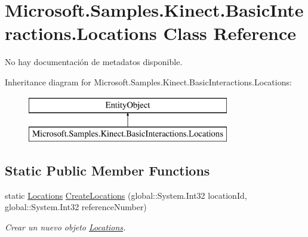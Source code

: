 \hypertarget{class_microsoft_1_1_samples_1_1_kinect_1_1_basic_interactions_1_1_locations}{\section{Microsoft.\-Samples.\-Kinect.\-Basic\-Interactions.\-Locations Class Reference}
\label{class_microsoft_1_1_samples_1_1_kinect_1_1_basic_interactions_1_1_locations}
}


No hay documentación de metadatos disponible.  


Inheritance diagram for Microsoft.\-Samples.\-Kinect.\-Basic\-Interactions.\-Locations\-:\begin{figure}[H]
\begin{center}
\leavevmode
\includegraphics[height=2.000000cm]{class_microsoft_1_1_samples_1_1_kinect_1_1_basic_interactions_1_1_locations}
\end{center}
\end{figure}
\subsection*{Static Public Member Functions}
\begin{DoxyCompactItemize}
\item 
static \hyperlink{class_microsoft_1_1_samples_1_1_kinect_1_1_basic_interactions_1_1_locations}{Locations} \hyperlink{class_microsoft_1_1_samples_1_1_kinect_1_1_basic_interactions_1_1_locations_ae28da466532f70d16b67cca6bae9ba6e}{Create\-Locations} (global\-::\-System.\-Int32 location\-Id, global\-::\-System.\-Int32 reference\-Number)
\begin{DoxyCompactList}\small\item\em Crear un nuevo objeto \hyperlink{class_microsoft_1_1_samples_1_1_kinect_1_1_basic_interactions_1_1_locations}{Locations}. \end{DoxyCompactList}\end{DoxyCompactItemize}
